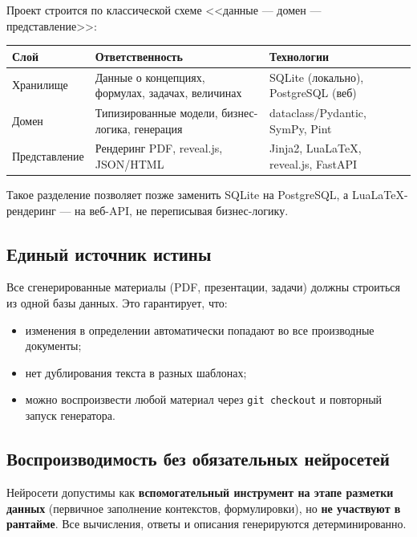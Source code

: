 \documentclass[12pt,a4paper]{article}
\newcommand{\code}[1]{\texttt{#1}}
\begin{document}
Проект строится по классической схеме <<данные --- домен --- представление>>:

\begin{center}
\begin{tabular}{@{}p{3.2cm}p{5.5cm}p{5.5cm}@{}}
\toprule
\textbf{Слой} & \textbf{Ответственность} & \textbf{Технологии} \\
\midrule
Хранилище & Данные о концепциях, формулах, задачах, величинах & SQLite (локально), PostgreSQL (веб) \\
Домен & Типизированные модели, бизнес-логика, генерация & dataclass/Pydantic, SymPy, Pint \\
Представление & Рендеринг PDF, reveal.js, JSON/HTML & Jinja2, LuaLaTeX, reveal.js, FastAPI \\
\bottomrule
\end{tabular}
\end{center}

\noindent
Такое разделение позволяет позже заменить SQLite на PostgreSQL,
а LuaLaTeX-рендеринг --- на веб-API, не переписывая бизнес-логику.

\subsection{Единый источник истины}

Все сгенерированные материалы (PDF, презентации, задачи) должны
строиться из одной базы данных. Это гарантирует, что:
\begin{itemize}
    \item изменения в определении автоматически попадают во все
          производные документы;
    \item нет дублирования текста в разных шаблонах;
    \item можно воспроизвести любой материал через \code{git checkout}
          и повторный запуск генератора.
\end{itemize}

\subsection{Воспроизводимость без обязательных нейросетей}

Нейросети допустимы как \textbf{вспомогательный инструмент на этапе
разметки данных} (первичное заполнение контекстов, формулировки),
но \textbf{не участвуют в рантайме}. Все вычисления, ответы и
описания генерируются детерминированно.

\end{document}
